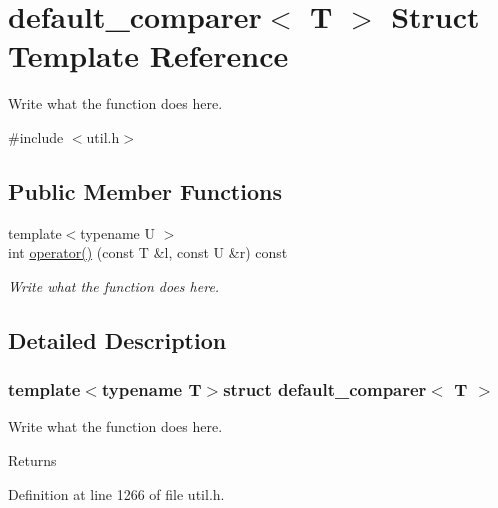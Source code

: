 \hypertarget{structdefault__comparer}{\section{default\+\_\+comparer$<$ T $>$ Struct Template Reference}
\label{structdefault__comparer}
}


Write what the function does here.  




{\ttfamily \#include $<$util.\+h$>$}

\subsection*{Public Member Functions}
\begin{DoxyCompactItemize}
\item 
{\footnotesize template$<$typename U $>$ }\\int \hyperlink{structdefault__comparer_a744d24d37aa02d789d6bd18ad90f2cac}{operator()} (const T \&l, const U \&r) const 
\begin{DoxyCompactList}\small\item\em Write what the function does here. \end{DoxyCompactList}\end{DoxyCompactItemize}


\subsection{Detailed Description}
\subsubsection*{template$<$typename T$>$struct default\+\_\+comparer$<$ T $>$}

Write what the function does here. 

\begin{DoxyReturn}{Returns}

\end{DoxyReturn}


Definition at line 1266 of file util.\+h.



